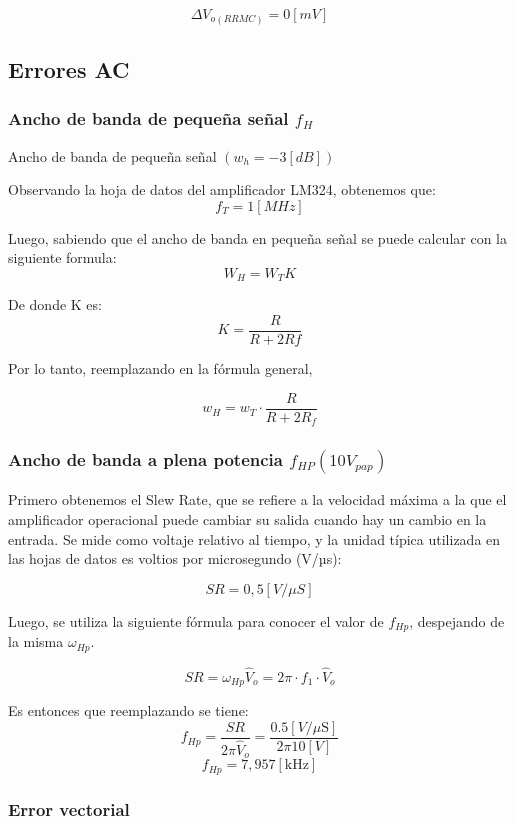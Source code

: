 \[ \Delta V_{o (RRMC) }=0 [ mV ]\]


\subsection{Errores AC}

\subsubsection{Ancho de banda de pequeña señal \texorpdfstring{$f_H$}{fH}}



Ancho de banda de pequeña señal $\left(w_{h}=-3[d B]\right)$

Observando la hoja de datos del amplificador LM324, obtenemos que:
\[f_T = 1 [MHz]\]
 

Luego, sabiendo que el ancho de banda en pequeña señal se puede calcular con la siguiente formula: 
\[ W_H = W_{T} K \]

De donde K es:
\[ K=\frac{R}{R+2 R f}\]

Por lo tanto, reemplazando en la fórmula general,

\[ w_H = w_{T} \cdot \frac{R}{R+2 R_f} \]


\subsubsection{Ancho de banda a plena potencia \texorpdfstring{$f_{HP} (10 V_{pap})$}{fH(10Vpap)} }

Primero obtenemos el Slew Rate, que se refiere a la velocidad máxima a la que el amplificador operacional puede cambiar su salida cuando hay un cambio en la entrada. Se mide como voltaje relativo al tiempo, y la unidad típica utilizada en las hojas de datos es voltios por microsegundo (V/µs):


 \[ S R=0,5[V / \mu S] \] 

Luego, se utiliza la siguiente fórmula para conocer el valor de $f_{Hp}$, despejando de la misma $\omega_{Hp}$.

\[ S R = \omega_{Hp} \hat{V}_{o} = 2 \pi \cdot  f_{1} \cdot  \hat{V}_{o} \]

Es entonces que reemplazando se tiene:
\[ f_{Hp} = \frac{S R}{2 \pi \hat{V}_{o}} = \frac{0.5[V/ \mu \mathrm{S}]}{2 \pi 10[V]} \]
\[ f_{Hp} = 7,957 [\mathrm{kHz}] \]

\subsubsection{Error vectorial }

